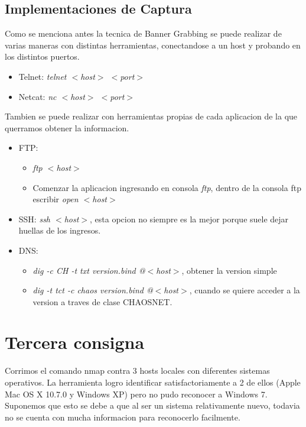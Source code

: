 \documentclass[a4paper]{article}
\begin{document}
\subsection{Implementaciones de Captura}
 
Como se menciona antes la tecnica de Banner Grabbing se puede realizar de varias maneras con distintas herramientas, conectandose a un host y probando en los distintos puertos.

\begin{itemize}
\item Telnet: \textit{telnet $<$host$>$  $<$port$>$}

\item Netcat: \textit{nc $<$host$>$ $<$port$>$}
\end{itemize} 

\clearpage

Tambien se puede realizar con herramientas propias de cada aplicacion de la que querramos obtener la informacion.

\begin{itemize}
\item FTP: \begin{itemize}
			\item \textit{ftp $<$host$>$}
			\item Comenzar la aplicacion ingresando en consola \textit{ftp}, dentro de la consola ftp escribir \textit{open $<$host$>$}
			\end{itemize}
			
\item SSH: \textit{ssh $<$host$>$}, esta opcion no siempre es la mejor porque suele dejar huellas de los ingresos.

\item DNS: \begin{itemize}
			\item \textit{dig -c CH -t txt version.bind @$<$host$>$}, obtener la version simple
			\item \textit{dig -t tct -c chaos version.bind @$<$host$>$}, cuando se quiere acceder a la version a traves de clase CHAOSNET.
			\end{itemize}
			
\end{itemize}


\newpage
\section{Tercera consigna}

Corrimos el comando nmap contra 3 hosts locales con diferentes sistemas operativos. La herramienta logro identificar satisfactoriamente a 2 de ellos (Apple Mac OS X 10.7.0 y Windows XP) pero no pudo reconocer a Windows 7. Suponemos que esto se debe a que al ser un sistema relativamente nuevo, todavia no se cuenta con mucha informacion para reconocerlo facilmente. \\
\end{document}
